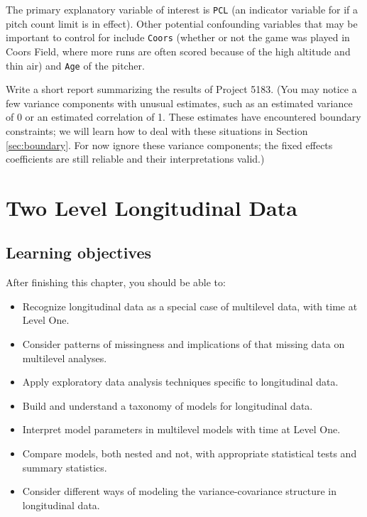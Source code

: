 \documentclass[
]{krantz}
\providecommand{\tightlist}{%
  \setlength{\itemsep}{0pt}\setlength{\parskip}{0pt}}
\begin{document}
\begin{enumerate}
  The primary explanatory variable of interest is \texttt{PCL} (an indicator variable for if a pitch count limit is in effect). Other potential confounding variables that may be important to control for include \texttt{Coors} (whether or not the game was played in Coors Field, where more runs are often scored because of the high altitude and thin air) and \texttt{Age} of the pitcher.

  Write a short report summarizing the results of Project 5183. (You may notice a few variance components with unusual estimates, such as an estimated variance of 0 or an estimated correlation of 1. These estimates have encountered boundary constraints; we will learn how to deal with these situations in Section \ref{sec:boundary}. For now ignore these variance components; the fixed effects coefficients are still reliable and their interpretations valid.)
\end{enumerate}

\hypertarget{ch-lon}{%
\chapter{Two Level Longitudinal Data}\label{ch-lon}}

\hypertarget{learning-objectives-8}{%
\section{Learning objectives}\label{learning-objectives-8}}

After finishing this chapter, you should be able to:

\begin{itemize}
\tightlist
\item
  Recognize longitudinal data as a special case of multilevel data, with time at Level One.
\item
  Consider patterns of missingness and implications of that missing data on multilevel analyses.
\item
  Apply exploratory data analysis techniques specific to longitudinal data.
\item
  Build and understand a taxonomy of models for longitudinal data.
\item
  Interpret model parameters in multilevel models with time at Level One.
\item
  Compare models, both nested and not, with appropriate statistical tests and summary statistics.
\item
  Consider different ways of modeling the variance-covariance structure in longitudinal data.
\end{itemize}
\end{document}
